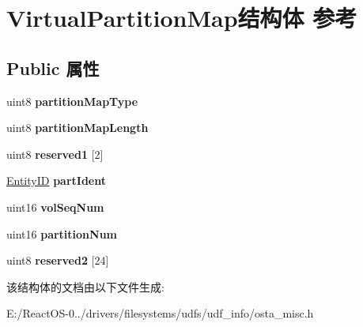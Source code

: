 \hypertarget{struct_virtual_partition_map}{}\section{Virtual\+Partition\+Map结构体 参考}
\label{struct_virtual_partition_map}
\subsection*{Public 属性}
\begin{DoxyCompactItemize}
\item 
\mbox{\label{struct_virtual_partition_map_a358b6ac1301c68da57e9659e93b7a5b2}} 
uint8 {\bfseries partition\+Map\+Type}
\item 
\mbox{\label{struct_virtual_partition_map_a4a186b64e479dbe58512c42ed7f691e1}} 
uint8 {\bfseries partition\+Map\+Length}
\item 
\mbox{\label{struct_virtual_partition_map_a78b9f2f1ec490b936b27aa5bff879c15}} 
uint8 {\bfseries reserved1} \mbox{[}2\mbox{]}
\item 
\mbox{\label{struct_virtual_partition_map_a0c89d1f77cc44857bce383ea5f99fb2d}} 
\hyperlink{struct_entity_i_d}{Entity\+ID} {\bfseries part\+Ident}
\item 
\mbox{\label{struct_virtual_partition_map_ac55096e67c27491ec56fb29e903566e5}} 
uint16 {\bfseries vol\+Seq\+Num}
\item 
\mbox{\label{struct_virtual_partition_map_a46bb38ed3bc895d922152e573b911ef4}} 
uint16 {\bfseries partition\+Num}
\item 
\mbox{\label{struct_virtual_partition_map_a729875352cf4ffe774f54d711f6b15c8}} 
uint8 {\bfseries reserved2} \mbox{[}24\mbox{]}
\end{DoxyCompactItemize}


该结构体的文档由以下文件生成\+:\begin{DoxyCompactItemize}
\item 
E\+:/\+React\+O\+S-\/0../drivers/filesystems/udfs/udf\+\_\+info/osta\+\_\+misc.\+h\end{DoxyCompactItemize}
